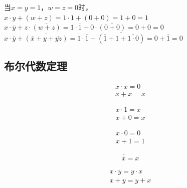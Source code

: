 \documentclass[12pt, openany, oneside]{book}
\begin{document}
\begin{tcolorbox}
	当$ x = y = 1 $，$ w = z = 0 $时，\\
	$ x \cdot y + (w + z) = 1 \cdot 1 + (0 + 0) = 1 + 0 = 1 $\\
	$ x \cdot \overline y + z \cdot \overline{(w + z)} = 1 \cdot \overline 1 + 0 \cdot \overline{(0 + 0)} = 0 + 0 = 0 $\\
	$ x \cdot \overline y + \overline{(\overline x + y + \overline{yz})} = 1 \cdot \overline 1 + \overline{(\overline 1 + 1 + \overline{1 \cdot 0})} = 0 + \overline 1 = 0 $
\end{tcolorbox}

\vspace{0.5cm}

\subsection{布尔代数定理}

\begin{tcolorbox}
	\begin{align}
		x \cdot x = 0 \\
		x + x = x
	\end{align}
\end{tcolorbox}

\begin{tcolorbox}
	\begin{align}
		x \cdot 1 = x \\
		x + 0 = x
	\end{align}
\end{tcolorbox}

\begin{tcolorbox}
	\begin{align}
		x \cdot 0 = 0 \\
		x + 1 = 1
	\end{align}
\end{tcolorbox}

\begin{tcolorbox}
	\begin{align}
		\overline {\overline x} = x
	\end{align}
\end{tcolorbox}

\begin{tcolorbox}
	\begin{align}
		x \cdot y = y \cdot x \\
		x + y = y + x
	\end{align}
\end{tcolorbox}
\end{document}
